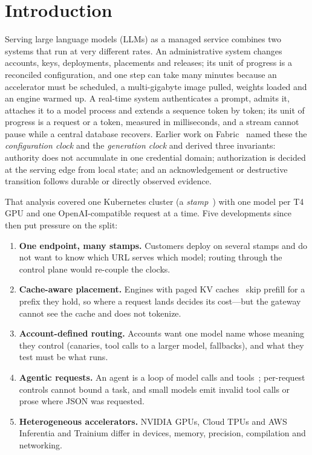 \documentclass[conference,letterpaper]{IEEEtran}
\newcommand{\sys}{Fabric}
\begin{document}
\section{Introduction}
\label{sec:intro}

Serving large language models (LLMs) as a managed service combines two systems that run at
very different rates. An administrative system changes accounts, keys, deployments,
placements and releases; its unit of progress is a reconciled configuration, and one step can
take many minutes because an accelerator must be scheduled, a multi-gigabyte image pulled,
weights loaded and an engine warmed up. A real-time system authenticates a prompt, admits it,
attaches it to a model process and extends a sequence token by token; its unit of progress
is a request or a token, measured in milliseconds, and a stream cannot pause while a central
database recovers. Earlier work on \sys{}~\cite{priorpaper} named these the
\emph{configuration clock} and the \emph{generation clock} and derived three invariants:
authority does not accumulate in one credential domain; authorization is decided at the
serving edge from local state; and an acknowledgement or destructive transition follows
durable or directly observed evidence.

That analysis covered one Kubernetes cluster (a \emph{stamp}~\cite{stamps}) with one model
per T4 GPU and one OpenAI-compatible request at a time. Five developments since then put
pressure on the split:
\begin{enumerate}
  \item \textbf{One endpoint, many stamps.} Customers deploy on several stamps and do not want
  to know which URL serves which model; routing through the control plane would re-couple the
  clocks.
  \item \textbf{Cache-aware placement.} Engines with paged KV caches~\cite{vllm,sglang} skip
  prefill for a prefix they hold, so where a request lands decides its cost---but the gateway
  cannot see the cache and does not tokenize.
  \item \textbf{Account-defined routing.} Accounts want one model name whose meaning they
  control (canaries, tool calls to a larger model, fallbacks), and what they test must be what
  runs.
  \item \textbf{Agentic requests.} An agent is a loop of model calls and tools~\cite{react,
  toolformer}; per-request controls cannot bound a task, and small models emit invalid tool
  calls or prose where JSON was requested.
  \item \textbf{Heterogeneous accelerators.} NVIDIA GPUs, Cloud TPUs and AWS
  Inferentia and Trainium differ in devices, memory, precision, compilation and networking.
\end{enumerate}
\end{document}
